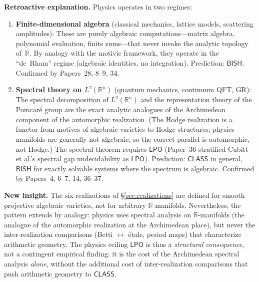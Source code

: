 \documentclass[11pt,a4paper]{article}
\theoremstyle{plain}
\theoremstyle{definition}
\newcommand{\BISH}{\textsf{BISH}}
\newcommand{\LPO}{\textsf{LPO}}
\newcommand{\CLASS}{\textsf{CLASS}}
\newcommand{\R}{\mathbb{R}}
\begin{document}
\medskip
\noindent\textbf{Retroactive explanation.} Physics operates in two regimes:
\begin{enumerate}[label=(\roman*)]
\item \textbf{Finite-dimensional algebra} (classical mechanics, lattice models, scattering amplitudes): These are purely algebraic computations---matrix algebra, polynomial evaluation, finite sums---that never invoke the analytic topology of~$\R$. By analogy with the motivic framework, they operate in the ``de~Rham'' regime (algebraic identities, no integration). Prediction: $\BISH$. Confirmed by Papers~28, 8--9, 34.

\item \textbf{Spectral theory on $L^2(\R^n)$} (quantum mechanics, continuum QFT, GR): The spectral decomposition of $L^2(\R^n)$ and the representation theory of the Poincar\'e group are the exact analytic analogues of the Archimedean component of the automorphic realization. (The Hodge realization is a functor from motives of algebraic varieties to Hodge structures; physics manifolds are generally not algebraic, so the correct parallel is automorphic, not Hodge.) The spectral theorem requires $\LPO$ (Paper~36 stratified Cubitt et al.'s spectral gap undecidability as $\LPO$). Prediction: $\CLASS$ in general, $\BISH$ for exactly solvable systems where the spectrum is algebraic. Confirmed by Papers~4, 6--7, 14, 36--37.
\end{enumerate}

\noindent\textbf{New insight.} The six realizations of \S\ref{sec:realizations} are defined for smooth projective algebraic varieties, not for arbitrary $\R$-manifolds. Nevertheless, the pattern extends by analogy: physics uses spectral analysis on $\R$-manifolds (the analogue of the automorphic realization at the Archimedean place), but never the inter-realization comparisons (Betti $\leftrightarrow$ \'etale, period maps) that characterize arithmetic geometry. The physics ceiling $\LPO$ is thus a \emph{structural consequence}, not a contingent empirical finding: it is the cost of the Archimedean spectral analysis \emph{alone}, without the additional cost of inter-realization comparisons that push arithmetic geometry to $\CLASS$.
\end{document}
